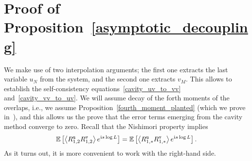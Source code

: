 \documentclass[final,12pt]{colt2018} %
\newcommand{\utt}{\textup{\texttt{u}}}
\newcommand{\vtt}{\textup{\texttt{v}}}
\begin{document}
\section{Proof of Proposition~\ref{asymptotic_decoupling}}
\label{sxn:proof_of_asymptotic_decoupling}
We make use of two interpolation arguments; the first one extracts the last variable $u_N$ from the system, and the second one extracts $v_M$. This allows to establish the self-consistency equations~\eqref{cavity_uv_to_vv} and~\eqref{cavity_vv_to_uv}.  We will assume decay of the forth moments of the overlaps, i.e., we assume Proposition~\ref{fourth_moment_planted} (which we prove in~), and this allows us the prove that the error terms emerging from the cavity method converge to zero.
Recall that the Nishimori property implies 
 \[\E\left[\left\langle R^{\utt}_{1,2}R^{\vtt}_{1,2}\right\rangle e^{\imnb s \log L}\right] =\E\left[\left\langle R^{\utt}_{1,*}R^{\vtt}_{1,*}\right\rangle e^{\imnb s \log L}\right].\]
As it turns out, it is more convenient to work with the right-hand side.
\end{document}
